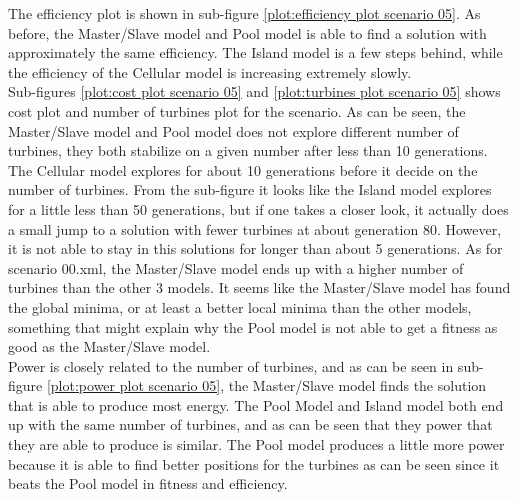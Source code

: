\noindent The efficiency plot is shown in sub-figure \ref{plot:efficiency plot scenario 05}. As before, the Master/Slave model and Pool model is able to find a solution with approximately the same efficiency. The Island model is a few steps behind, while the efficiency of the Cellular model is increasing extremely slowly. \\


\noindent Sub-figures \ref{plot:cost plot scenario 05} and \ref{plot:turbines plot scenario 05} shows cost plot and number of turbines plot for the scenario. As can be seen, the Master/Slave model and Pool model does not explore different number of turbines, they both stabilize on a given number after less than 10 generations. The Cellular model explores for about 10 generations before it decide on the number of turbines. From the sub-figure it looks like the Island model explores for a little less than 50 generations, but if one takes a closer look, it actually does a small jump to a solution with fewer turbines at about generation 80. However, it is not able to stay in this solutions for longer than about 5 generations. As for scenario 00.xml, the Master/Slave model ends up with a higher number of turbines than the other 3 models. It seems like the Master/Slave model has found the global minima, or at least a better local minima than the other models, something that might explain why the Pool model is not able to get a fitness as good as the Master/Slave model.\\


\noindent Power is closely related to the number of turbines, and as can be seen in sub-figure \ref{plot:power plot scenario 05}, the Master/Slave model finds the solution that is able to produce most energy. The Pool Model and Island model both end up with the same number of turbines, and as can be seen that they power that they are able to produce is similar. The Pool model produces a little more power because it is able to find better positions for the turbines as can be seen since it beats the Pool model in fitness and efficiency. \\


